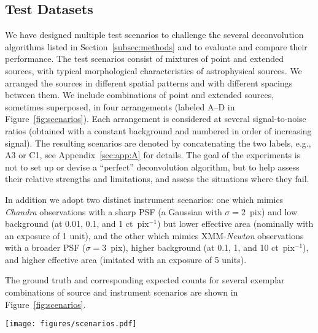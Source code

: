 \documentclass[twocolumn, lineno]{aastex631}
\newcommand{\chandra}{\textit{Chandra}~}
\newcommand{\chandranospace}{\textit{Chandra}}
\newcommand{\xmm}{\textit{XMM}~}
\begin{document}
    \subsection{Test Datasets}
    \label{subsec:test-datasets}
    We have designed multiple test scenarios to challenge the several deconvolution algorithms listed in Section~\ref{subsec:methods} and to evaluate and compare their performance. The test scenarios consist of mixtures of point and extended sources, with typical morphological characteristics of astrophysical sources. We arranged the sources in different spatial patterns and with different spacings between them. We include combinations of point and extended sources, sometimes superposed, in four arrangements (labeled A--D in Figure~\ref{fig:scenarios}). Each arrangement is considered at several signal-to-noise ratios (obtained with a constant background and numbered in order of increasing signal). The resulting scenarios are denoted by concatenating the two labels, e.g., A3 or C1, see Appendix~\ref{sec:app:A} for details.  The goal of the experiments is not to set up or devise a \enquote{perfect} deconvolution algorithm, but to help assess their relative strengths and limitations,
    and assess the situations where they fail.
    
    In addition we adopt two distinct instrument scenarios: one which mimics \textit{Chandra} observations with a sharp PSF (a Gaussian with $\sigma=2$~pix) and low background (at 0.01, 0.1, and 1 ct~pix$^{-1}$) but lower effective area (nominally with an exposure of 1 unit), and the other which mimics XMM-\textit{Newton} observations with a broader PSF ($\sigma=3$~pix), higher background (at 0.1, 1, and 10 ct~pix$^{-1}$), and higher effective area (imitated with an exposure of 5 units).
        
    The ground truth and corresponding expected counts for several exemplar combinations of source and instrument scenarios are shown in Figure~\ref{fig:scenarios}. 
    
    \begin{figure*}
        \centering\texttt{[image: figures/scenarios.pdf]}
        \caption{Illustration of the expected counts for the different source scenarios we used to generate test datasets. The source patterns shown are for the {\sl (A)}  {\tt points}, {\sl (B) {\tt asterism}}, {\sl (C)} {\tt shield}, and {\sl (D)} {\tt spiral} cases (see Section~\ref{sec:app:A}. For the \chandra instrument scenario we convolve the ground truth image with a narrow Gaussian shaped PSF of width $\sigma=2$~pix. For the \xmm scenario we used a Gaussian shaped PSF with a width of $\sigma=6$~pix and an effective area that is five times larger than that of \chandranospace. All images are of size $128{\times}128$ pixels.
        }
        \label{fig:scenarios}
    \end{figure*}
     
\end{document}
